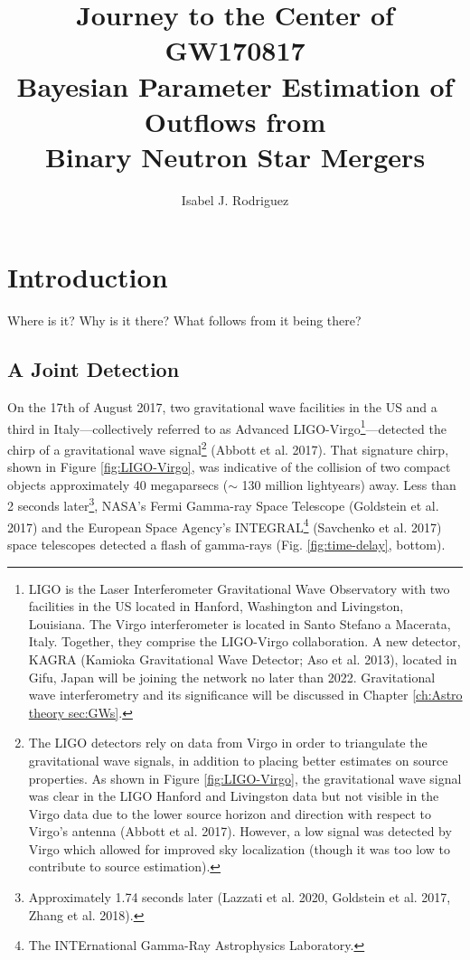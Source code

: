 \documentclass[1.5,11pt]{beavtex}
\title{\fontfamily{lmss}\selectfont Journey to the Center of GW170817 \\ Bayesian Parameter Estimation of Outflows from \\ Binary Neutron Star Mergers}
\author{Isabel J. Rodriguez}
\begin{document}
\maketitle
\mainmatter


\chapter{\selectfont Introduction} \label{ch:Intro}
 \begin{fquote}Where is it? Why is it there? What follows from it being there?
\end{fquote}


\section{A Joint Detection} \label{ch:Intro sec:joint detection}

On the 17th of August 2017, two gravitational wave facilities in the US and a third in Italy---collectively referred to as Advanced LIGO-Virgo\footnote{\selectfont LIGO is the  Laser Interferometer Gravitational Wave Observatory with two facilities in the US located in Hanford, Washington and Livingston, Louisiana. The Virgo interferometer is located in Santo Stefano a Macerata, Italy. Together, they comprise the LIGO-Virgo collaboration. A new detector, KAGRA (Kamioka Gravitational Wave Detector; Aso et al. 2013), located in  Gifu, Japan will be joining the network no later than 2022. Gravitational wave interferometry and its significance will be discussed in Chapter \ref{ch:Astro theory sec:GWs}.}---detected the chirp of a gravitational wave signal\footnote{\selectfont The LIGO detectors rely on data from Virgo in order to triangulate the gravitational wave signals, in addition to placing better estimates on source properties. As shown in Figure \ref{fig:LIGO-Virgo}, the gravitational wave signal was clear in the LIGO Hanford and Livingston data but not visible in the Virgo data due to the lower source horizon and direction with respect to Virgo's antenna (Abbott et al. 2017). However, a low signal was detected by Virgo which allowed for improved sky localization (though it was too low to contribute to source estimation).} (Abbott et al. 2017). That signature chirp, shown in Figure \ref{fig:LIGO-Virgo}, was indicative of the collision of two compact objects approximately 40 megaparsecs ($\sim$ 130 million lightyears) away.  Less than 2 seconds later\footnote{\selectfont Approximately 1.74 seconds later (Lazzati et al. 2020, Goldstein et al. 2017, Zhang et al. 2018).}, NASA's Fermi Gamma-ray Space Telescope (Goldstein et al. 2017) and the European Space Agency's INTEGRAL\footnote{The INTErnational Gamma-Ray Astrophysics Laboratory.} (Savchenko et al. 2017) space telescopes detected a flash of gamma-rays (Fig. \ref{fig:time-delay}, bottom).
\end{document}
